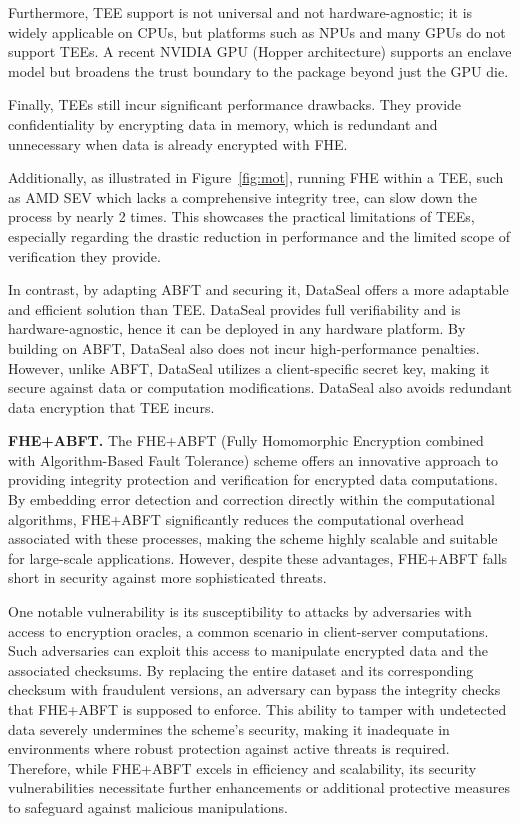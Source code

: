 Furthermore, TEE support is not universal and not hardware-agnostic; it is widely applicable on CPUs, but platforms such as NPUs and many GPUs do not support TEEs. A recent NVIDIA GPU (Hopper architecture) supports an enclave model but broadens the trust boundary to the package beyond just the GPU die. 

Finally, TEEs still incur significant performance drawbacks. They provide confidentiality by encrypting data in memory, which is redundant and unnecessary when data is already encrypted with FHE. 

Additionally, as illustrated in Figure~\ref{fig:mot}, running FHE within a TEE, such as AMD SEV which lacks a comprehensive integrity tree, can slow down the process by nearly 2 times. This showcases the practical limitations of TEEs, especially regarding the drastic reduction in performance and the limited scope of verification they provide.

In contrast, by adapting ABFT and securing it, DataSeal offers a more adaptable and efficient solution than TEE. DataSeal provides full verifiability and is hardware-agnostic, hence it can be deployed in any hardware platform. By building on ABFT, DataSeal also does not incur high-performance penalties. However, unlike ABFT, DataSeal utilizes a client-specific secret key, making it secure against data or computation modifications. DataSeal also avoids redundant data encryption that TEE incurs. 



\noindent\textbf{FHE+ABFT.}
The FHE+ABFT (Fully Homomorphic Encryption combined with Algorithm-Based Fault Tolerance) scheme offers an innovative approach to providing integrity protection and verification for encrypted data computations. By embedding error detection and correction directly within the computational algorithms, FHE+ABFT significantly reduces the computational overhead associated with these processes, making the scheme highly scalable and suitable for large-scale applications. However, despite these advantages, FHE+ABFT falls short in security against more sophisticated threats. 

One notable vulnerability is its susceptibility to attacks by adversaries with access to encryption oracles, a common scenario in client-server computations. Such adversaries can exploit this access to manipulate encrypted data and the associated checksums. By replacing the entire dataset and its corresponding checksum with fraudulent versions, an adversary can bypass the integrity checks that FHE+ABFT is supposed to enforce. This ability to tamper with undetected data severely undermines the scheme's security, making it inadequate in environments where robust protection against active threats is required. Therefore, while FHE+ABFT excels in efficiency and scalability, its security vulnerabilities necessitate further enhancements or additional protective measures to safeguard against malicious manipulations.

